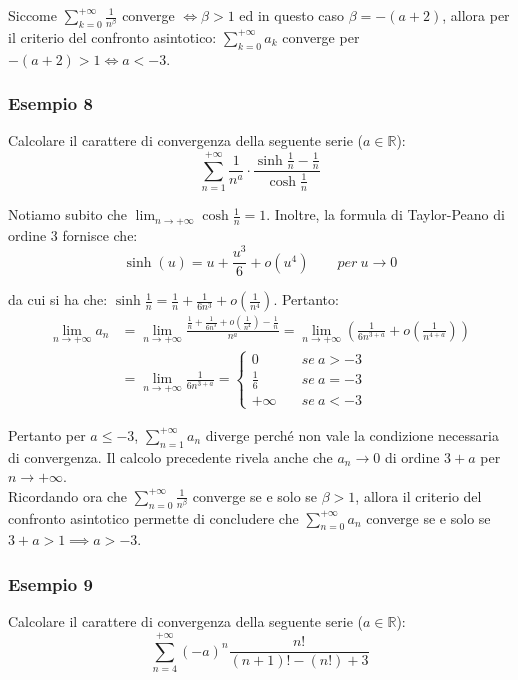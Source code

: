 \documentclass{article}
\begin{document}
\noindent Siccome $\sum_{k = 0}^{+\infty} \frac{1}{n^\beta}$ converge $\iff \beta > 1$ ed in questo caso $\beta = -(a + 2)$, allora per il criterio del confronto asintotico: $\sum_{k = 0}^{+\infty} a_k$ converge per $- (a + 2) > 1 \iff a < - 3$.

\subsubsection{Esempio 8}
Calcolare il carattere di convergenza della seguente serie ($a \in \mathbb{R}$):
\begin{equation*}
    \sum_{n = 1}^{+\infty} \frac{1}{n^a} \cdot \frac{\sinh\frac{1}{n} - \frac{1}{n}}{\cosh\frac{1}{n}} 
\end{equation*}

\noindent Notiamo subito che $\lim_{n \to +\infty}\cosh\frac{1}{n} = 1$. Inoltre, la formula di Taylor-Peano di ordine $3$ fornisce che:
\begin{equation*}
    \sinh(u) = u + \frac{u^3}{6} + o(u^4) \qquad per \ u \to 0
\end{equation*}

\noindent da cui si ha che: $\sinh\frac{1}{n} = \frac{1}{n} + \frac{1}{6n^3} + o(\frac{1}{n^4})$. Pertanto:
\begin{align*}
    \lim_{n \to +\infty} a_n &= \lim_{n \to +\infty} \frac{\frac{1}{n} + \frac{1}{6n^3} + o(\frac{1}{n^4}) - \frac{1}{n}}{n^a} = \lim_{n \to +\infty} \left(\frac{1}{6n^{3 + a}} + o\left(\frac{1}{n^{4 + a}}\right)\right) \\ 
    &= \lim_{n \to +\infty} \frac{1}{6n^{3 + a}} = \begin{cases}
        0 & \quad se \ a > -3 \\
        \frac{1}{6} & \quad se \ a = -3 \\
        +\infty & \quad se \ a < -3
    \end{cases}
\end{align*}

\noindent Pertanto per $a \leq -3$, $\sum_{n = 1}^{+\infty} a_n$ diverge perché non vale la condizione necessaria di convergenza. Il calcolo precedente rivela anche che $a_n \to 0$ di ordine $3 + a$ per $n \to +\infty$.\\
Ricordando ora che $\sum_{n = 0}^{+\infty} \frac{1}{n^\beta}$ converge se e solo se $\beta > 1$, allora il criterio del confronto asintotico permette di concludere che $\sum_{n = 0}^{+\infty} a_n$ converge se e solo se $3 + a > 1 \implies a > -3$.

\subsubsection{Esempio 9}
Calcolare il carattere di convergenza della seguente serie ($a \in \mathbb{R}$): 
\begin{equation*}
    \sum_{n = 4}^{+\infty} (-a)^n \frac{n!}{(n + 1)! - (n!) + 3}
\end{equation*}
\end{document}
